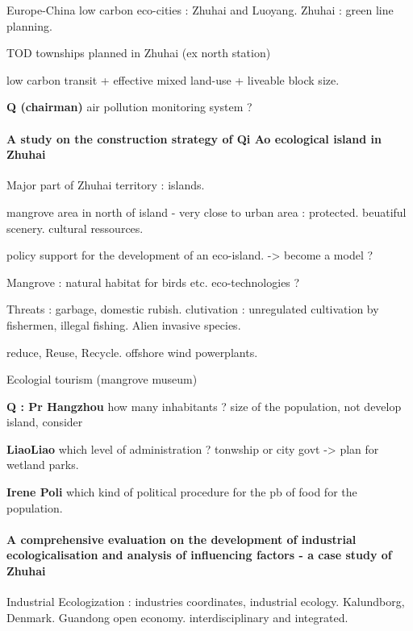 Europe-China low carbon eco-cities : Zhuhai and Luoyang. Zhuhai : green line planning. 

TOD townships planned in Zhuhai (ex north station)

low carbon transit + effective mixed land-use + liveable block size.

\textbf{Q (chairman)} air pollution monitoring system ?








\paragraph{A study on the construction strategy of Qi Ao ecological island in Zhuhai}

Major part of Zhuhai territory : islands.

mangrove area in north of island - very close to urban area : protected. beuatiful scenery. cultural ressources. 

policy support for the development of an eco-island. -> become a model ?

Mangrove : natural habitat for birds etc. eco-technologies ?

Threats : garbage, domestic rubish. clutivation : unregulated cultivation by fishermen, illegal fishing. Alien invasive species.

reduce, Reuse, Recycle. offshore wind powerplants.

Ecologial tourism (mangrove museum)

\textbf{Q : Pr Hangzhou} how many inhabitants ? size of the population, not develop island, consider 

\textbf{LiaoLiao} which level of administration ? tonwship or city govt -> plan for wetland parks.

\textbf{Irene Poli} which kind of political procedure for the pb of food for the population. 






\paragraph{A comprehensive evaluation on the development of industrial ecologicalisation and analysis of influencing factors - a case study of Zhuhai}


Industrial Ecologization : industries coordinates, industrial ecology.
Kalundborg, Denmark.
Guandong open economy.
interdisciplinary and integrated.

